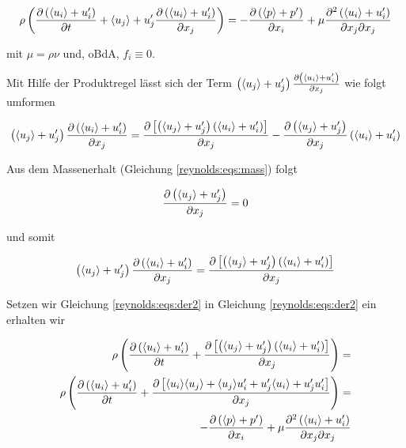 \begin{equation}
    \label{reynolds:eqs:der1}
    \rho \left( \frac{\partial \left( \langle u_i \rangle + u_i' \right)}{\partial t} + \langle u_j \rangle + u_j' \frac{\partial \left( \langle u_i \rangle + u_i' \right)}{\partial x_j} \right) =
        - \frac{\partial \left( \langle p \rangle + p' \right)}{\partial x_i} + 
        \mu \frac{\partial^2 \left( \langle u_i \rangle + u_i' \right)}{\partial x_j \partial x_j}
\end{equation}

mit $\mu = \rho \nu$ und, oBdA, $f_i \equiv 0$.

Mit Hilfe der Produktregel lässt sich der Term $\left( \langle u_j \rangle + u_j' \right) \frac{\partial \left( \langle u_i \rangle + u_i' \right)}{\partial x_j}$
wie folgt umformen

\begin{equation}
    \left( \langle u_j \rangle + u_j' \right) \frac{\partial \left( \langle u_i \rangle + u_i' \right)}{\partial x_j} =
        \frac{\partial \left[ \left( \langle u_j \rangle + u_j' \right) \left( \langle u_i \rangle + u_i' \right) \right]}{\partial x_j}
        - \frac{\partial \left( \langle u_j \rangle + u_j' \right)}{\partial x_j} \left( \langle u_i \rangle + u_i' \right)
\end{equation}

Aus dem Massenerhalt (Gleichung \ref{reynolds:eqs:mass}) folgt

\begin{equation}
    \frac{\partial \left( \langle u_j \rangle + u_j' \right)}{\partial x_j} = 0
\end{equation}

und somit

\begin{equation}
    \label{reynolds:eqs:der2}
    \left( \langle u_j \rangle + u_j' \right) \frac{\partial \left( \langle u_i \rangle + u_i' \right)}{\partial x_j} =
        \frac{\partial \left[ \left( \langle u_j \rangle + u_j' \right) \left( \langle u_i \rangle + u_i' \right) \right]}{\partial x_j}
\end{equation}

Setzen wir Gleichung \ref{reynolds:eqs:der2} in Gleichung \ref{reynolds:eqs:der2} ein erhalten wir

\begin{align}
    \rho \left(
            \frac{\partial \left( \langle u_i \rangle + u_i' \right)}{\partial t} +
            \frac{\partial \left[ \left( \langle u_j \rangle + u_j' \right) \left( \langle u_i \rangle + u_i' \right) \right]}{\partial x_j}
        \right) = \\
    \rho \left(
            \frac{\partial \left( \langle u_i \rangle + u_i' \right)}{\partial t} +
            \frac{\partial \left[ \langle u_i \rangle \langle u_j \rangle  + \langle u_j \rangle u_i' + u_j' \langle u_i \rangle + u_j' u_i'\right]}{\partial x_j}
        \right) = \\
    - \frac{\partial \left( \langle p \rangle + p' \right)}{\partial x_i} + 
    \mu \frac{\partial^2 \left( \langle u_i \rangle + u_i' \right)}{\partial x_j \partial x_j}
\end{align}

